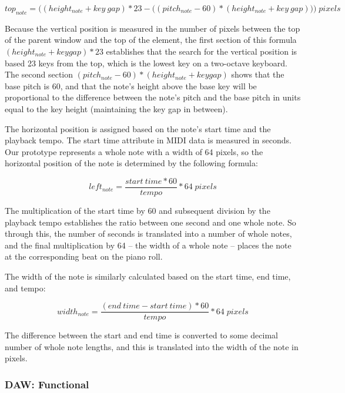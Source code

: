 \begin{equation} \label{note_vert}
  top_{note} = \Big((height_{note} + key\:gap) * 23 - \big((pitch_{note} -  60) * (height_{note} + key\:gap)\big)\Big)\;pixels
\end{equation}

Because the vertical position is measured in the number of pixels between the top of the parent
window and the top of the element, the first section of this formula $ (height_{note} + keygap) * 23 $
establishes that the search for the vertical position is based 23 keys from the top, which is
the lowest key on a two-octave keyboard. The second section $ (pitch_{note} -  60) * (height_{note} + keygap) $
shows that the base pitch is 60, and that the note's height above the base key will be
proportional to the difference between the note's pitch and the base pitch in units equal to the
key height (maintaining the key gap in between).

The horizontal position is assigned based on the note's start time and the playback tempo. The
start time attribute in MIDI data is measured in seconds. Our prototype represents a whole note
with a width of 64 pixels, so the horizontal position of the note is determined by the following
formula:

\begin{equation} \label{note_vert}
  left_{note} = \frac{start\:time * 60}{tempo} * 64\;pixels
\end{equation}

The multiplication of the start time by 60 and subsequent division by the playback tempo
establishes the ratio between one second and one whole note. So through this, the number of
seconds is translated into a number of whole notes, and the final multiplication by 64 -- the width
of a whole note -- places the note at the corresponding beat on the piano roll.

The width of the note is similarly calculated based on the start time, end time, and tempo:

\begin{equation} \label{note_vert}
  width_{note} = \frac{(end\:time - start\:time) * 60}{tempo} * 64\;pixels
\end{equation}

The difference between the start and end time is converted to some decimal number of whole note
lengths, and this is translated into the width of the note in pixels.

\subsubsection{DAW: Functional}

